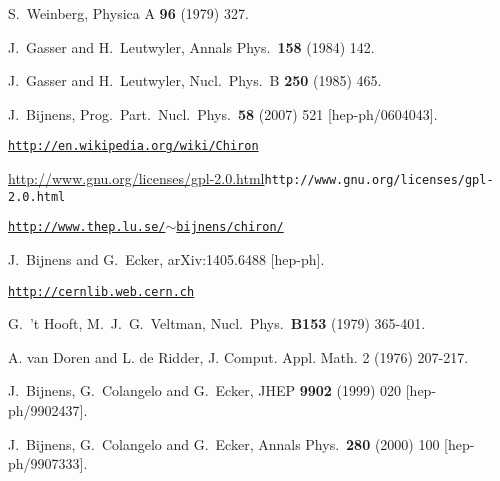 \documentclass[12pt,a4paper]{article}
\begin{document}
\begin{thebibliography}{99}


  S.~Weinberg,
  Physica A {\bf 96} (1979) 327.

  J.~Gasser and H.~Leutwyler,
  Annals Phys.\  {\bf 158} (1984) 142.

  J.~Gasser and H.~Leutwyler,
  Nucl.\ Phys.\ B {\bf 250} (1985) 465.

  J.~Bijnens,
  Prog.\ Part.\ Nucl.\ Phys.\  {\bf 58} (2007) 521
  [hep-ph/0604043].

 \href{http://en.wikipedia.org/wiki/Chiron}{\tt http://en.wikipedia.org/wiki/Chiron}

 \url{http://www.gnu.org/licenses/gpl-2.0.html}{\tt http://www.gnu.org/licenses/gpl-2.0.html}


 \href{http://www.thep.lu.se/~bijnens/chiron/}{\tt http://www.thep.lu.se/$\sim$bijnens/chiron/}

  J.~Bijnens and G.~Ecker,
  arXiv:1405.6488 [hep-ph].

 \href{http://cernlib.web.cern.ch}{\tt http://cernlib.web.cern.ch}

  G.~'t Hooft, M.~J.~G.~Veltman,
  Nucl.\ Phys.\  {\bf B153 } (1979)  365-401.

A. van Doren and L. de Ridder, 
J. Comput. Appl. Math. 2 (1976) 207-217. 

  J.~Bijnens, G.~Colangelo and G.~Ecker,
  JHEP {\bf 9902} (1999) 020
  [hep-ph/9902437].

  J.~Bijnens, G.~Colangelo and G.~Ecker,
  Annals Phys.\  {\bf 280} (2000) 100
  [hep-ph/9907333].


\end{thebibliography}
\end{document}
